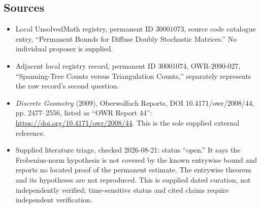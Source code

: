 \documentclass[11pt]{article}
\begin{document}
\subsection{Sources}
\begin{itemize}
\item Local UnsolvedMath registry, permanent ID \(30001073\), source code catalogue entry, ``Permanent Bounds for Diffuse Doubly Stochastic Matrices.'' No individual proposer is supplied.
\item Adjacent local registry record, permanent ID \(30001074\), OWR-2090-027, ``Spanning-Tree Counts versus Triangulation Counts,'' separately represents the raw record's second question.
\item \emph{Discrete Geometry} (2009), Oberwolfach Reports, DOI 10.4171/owr/2008/44, pp. 2477--2556, listed as ``OWR Report 44'': \url{https://doi.org/10.4171/owr/2008/44}. This is the sole supplied external reference.
\item Supplied literature triage, checked 2026-08-21: status ``open.'' It says the Frobenius-norm hypothesis is not covered by the known entrywise bound and reports no located proof of the permanent estimate. The entrywise theorem and its hypotheses are not reproduced. This is supplied dated curation, not independently verified; time-sensitive status and cited claims require independent verification.
\end{itemize}
\end{document}
